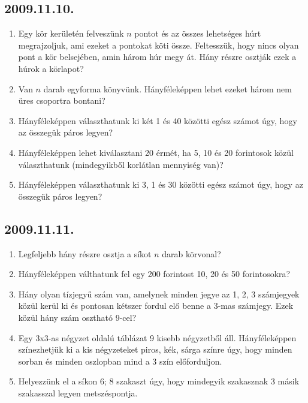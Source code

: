 \documentclass{article}
\begin{document}
\subsection*{2009.11.10.}
\begin{enumerate}
\item Egy kör kerületén felveszünk $n$ pontot és az összes lehetséges húrt megrajzoljuk, ami ezeket a pontokat köti össze. Feltesszük, hogy nincs olyan pont a kör belsejében, amin három húr megy át. Hány részre osztják ezek a húrok a körlapot?
\item Van $n$ darab egyforma könyvünk. Hányféleképpen lehet ezeket három nem üres csoportra bontani?
\item Hányféleképpen választhatunk ki két 1 és 40 közötti egész számot úgy, hogy az összegük páros legyen?
\item Hányféleképpen lehet kiválasztani 20 érmét, ha 5,  10 és 20 forintosok közül választhatunk (mindegyikből korlátlan mennyiség van)?
\item Hányféleképpen választhatunk ki 3, 1 és 30 közötti egész számot úgy, hogy az összegük páros legyen?
\end{enumerate}

\subsection*{2009.11.11.}
\begin{enumerate}
\item Legfeljebb hány részre osztja a síkot $n$ darab körvonal?
\item Hányféleképpen válthatunk fel egy 200 forintost 10, 20 és 50 forintosokra?
\item Hány olyan tízjegyű szám van, amelynek minden jegye az 1, 2, 3 számjegyek közül kerül ki és pontosan kétszer fordul elő benne a 3-mas számjegy. Ezek közül hány szám osztható 9-cel?
\item Egy 3x3-as négyzet oldalú táblázat 9 kisebb négyzetből áll. Hányféleképpen színezhetjük ki a kis négyzeteket piros, kék, sárga színre úgy, hogy minden sorban és minden oszlopban mind a 3 szín előforduljon.
\item Helyezzünk el a síkon 6; 8 szakaszt úgy, hogy mindegyik szakasznak 3 másik szakasszal legyen metszéspontja.
\end{enumerate}
\end{document}
